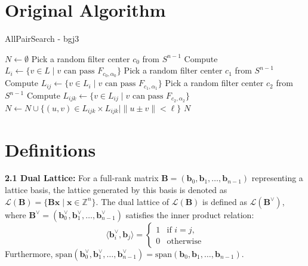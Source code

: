 \documentclass{article}
\begin{document}
\section{Original Algorithm}

\begin{algorithm}[H] %
\caption{AllPairSearch - bgj3} \label{alg:all_pair_search}
\begin{algorithmic}[1]
\State $N \gets \emptyset$
    \State Pick a random filter center $c_0$ from $S^{n-1}$
    \State Compute $L_i \gets \{ v \in L \mid v \text{ can pass } F_{c_0, \alpha_0} \}$
        \State Pick a random filter center $c_1$ from $S^{n-1}$
        \State Compute $L_{ij} \gets \{ v \in L_i \mid v \text{ can pass } F_{c_1, \alpha_1} \}$
            \State Pick a random filter center $c_2$ from $S^{n-1}$
            \State Compute $L_{ijk} \gets \{ v \in L_{ij} \mid v \text{ can pass } F_{c_2, \alpha_2} \}$
            \State $N \gets N \cup \{ (u, v) \in L_{ijk} \times L_{ijk} \mid \|u \pm v\| < \ell \}$
        \EndFor
    \EndFor
\EndFor
\State \Return $N$
\end{algorithmic}
\end{algorithm}

\section{Definitions}

\textbf{2.1 Dual Lattice:} For a full-rank matrix $\mathbf{B} = (\mathbf{b}_0, \mathbf{b}_1, \ldots, \mathbf{b}_{n-1})$ representing a lattice basis, the lattice generated by this basis is denoted as $\mathcal{L}(\mathbf{B}) = \{ \mathbf{Bx} \mid \mathbf{x} \in \mathbb{Z}^n \}$. The dual lattice of $\mathcal{L}(\mathbf{B})$ is defined as $\mathcal{L}(\mathbf{B}^{\vee})$, where $\mathbf{B}^{\vee} = (\mathbf{b}_0^{\vee}, \mathbf{b}_1^{\vee}, \ldots, \mathbf{b}_{n-1}^{\vee})$ satisfies the inner product relation:
\[
\langle \mathbf{b}_i^{\vee}, \mathbf{b}_j \rangle = \begin{cases} 1 & \text{if } i = j, \\ 0 & \text{otherwise} \end{cases}
\]
Furthermore, $\text{span}(\mathbf{b}_0^{\vee}, \mathbf{b}_1^{\vee}, \ldots, \mathbf{b}_{n-1}^{\vee}) = \text{span}(\mathbf{b}_0, \mathbf{b}_1, \ldots, \mathbf{b}_{n-1})$.\\
\end{document}
